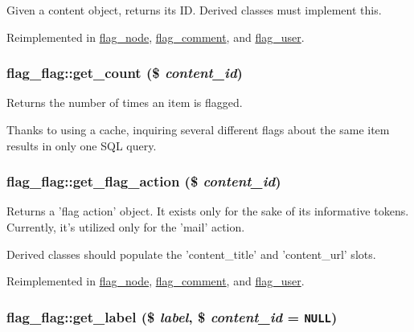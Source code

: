 Given a content object, returns its ID. Derived classes must implement this.

Reimplemented in \hyperlink{classflag__node_7615ffc75f3b60c56032d7df1ad1e734}{flag\_\-node}, \hyperlink{classflag__comment_69760ed8615fd076652d702a03c261aa}{flag\_\-comment}, and \hyperlink{classflag__user_3cb6ed47377662232c4f41bfe2f41f09}{flag\_\-user}.\hypertarget{classflag__flag_0c554010b3ba4b116a2ace87d5703276}{
\subsubsection[{get\_\-count}]{\setlength{\rightskip}{0pt plus 5cm}flag\_\-flag::get\_\-count (\$ {\em content\_\-id})}}
\label{classflag__flag_0c554010b3ba4b116a2ace87d5703276}


Returns the number of times an item is flagged.

Thanks to using a cache, inquiring several different flags about the same item results in only one SQL query. \hypertarget{classflag__flag_532e58b6e71a0ef8f6bcb55607cbca8e}{
\subsubsection[{get\_\-flag\_\-action}]{\setlength{\rightskip}{0pt plus 5cm}flag\_\-flag::get\_\-flag\_\-action (\$ {\em content\_\-id})}}
\label{classflag__flag_532e58b6e71a0ef8f6bcb55607cbca8e}


Returns a 'flag action' object. It exists only for the sake of its informative tokens. Currently, it's utilized only for the 'mail' action.

Derived classes should populate the 'content\_\-title' and 'content\_\-url' slots. 

Reimplemented in \hyperlink{classflag__node_124cd24063689c68b497c83707dc4f40}{flag\_\-node}, \hyperlink{classflag__comment_9f4e0def33514ead29271f9628902d5c}{flag\_\-comment}, and \hyperlink{classflag__user_6b753497cc4bd54f8328b8d0e7185142}{flag\_\-user}.\hypertarget{classflag__flag_a1c3caa4b642328ce9ff999ab0cf128b}{
\subsubsection[{get\_\-label}]{\setlength{\rightskip}{0pt plus 5cm}flag\_\-flag::get\_\-label (\$ {\em label}, \/  \$ {\em content\_\-id} = {\tt NULL})}}
\label{classflag__flag_a1c3caa4b642328ce9ff999ab0cf128b}


